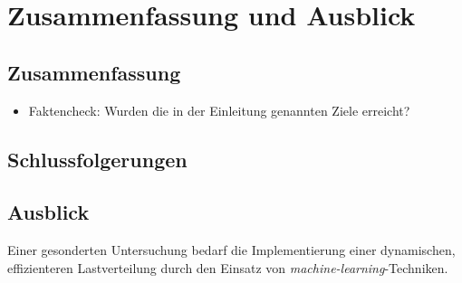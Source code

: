 \chapter{Zusammenfassung und Ausblick}

\section{Zusammenfassung}

\begin{itemize}
    \item Faktencheck: Wurden die in der Einleitung genannten Ziele erreicht?
\end{itemize}

\section{Schlussfolgerungen}

\section{Ausblick}

Einer gesonderten Untersuchung bedarf die Implementierung einer dynamischen, effizienteren Lastverteilung durch den
Einsatz von \textit{machine-learning}-Techniken.
